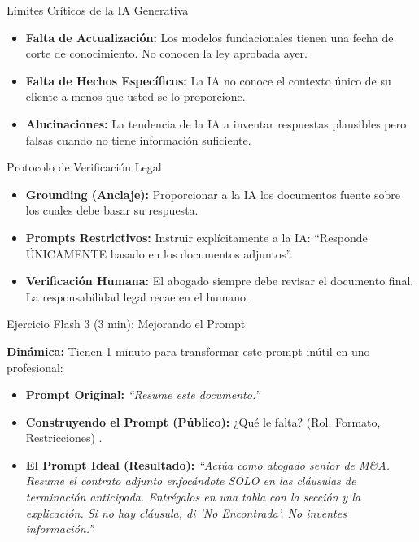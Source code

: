 \documentclass[aspectratio=169]{beamer}
\begin{document}
\begin{frame}{Límites Críticos de la IA Generativa}


\begin{itemize}
  \item \textbf{Falta de Actualización:} Los modelos fundacionales tienen una fecha de corte de conocimiento. No conocen la ley aprobada ayer.
  \item \textbf{Falta de Hechos Específicos:} La IA no conoce el contexto único de su cliente a menos que usted se lo proporcione.
  \item \textbf{Alucinaciones:} La tendencia de la IA a inventar respuestas plausibles pero falsas cuando no tiene información suficiente.
\end{itemize}
\end{frame}

\begin{frame}{Protocolo de Verificación Legal}


\begin{itemize}
  \item \textbf{Grounding (Anclaje):} Proporcionar a la IA los documentos fuente sobre los cuales debe basar su respuesta.
  \item \textbf{Prompts Restrictivos:} Instruir explícitamente a la IA: ``Responde ÚNICAMENTE basado en los documentos adjuntos''.
  \item \textbf{Verificación Humana:} El abogado siempre debe revisar el documento final. La responsabilidad legal recae en el humano.
\end{itemize}
\end{frame}

\begin{frame}{Ejercicio Flash 3 (3 min): Mejorando el Prompt}


\textbf{Dinámica:} Tienen 1 minuto para transformar este prompt inútil en uno profesional:
\begin{itemize}
  \item \textbf{Prompt Original:} \textit{``Resume este documento.''}
  \item \textbf{Construyendo el Prompt (Público):} ¿Qué le falta? (Rol, Formato, Restricciones) \cite{murray2024}.
  \item \textbf{El Prompt Ideal (Resultado):} \textit{``Actúa como abogado senior de M\&A. Resume el contrato adjunto enfocándote SOLO en las cláusulas de terminación anticipada. Entrégalos en una tabla con la sección y la explicación. Si no hay cláusula, di 'No Encontrada'. No inventes información.''}
\end{itemize}
\end{frame}
\end{document}
